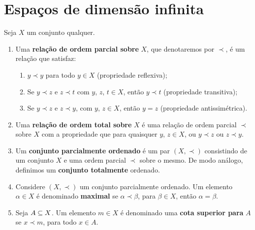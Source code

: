 \section{Espa\c{c}os de dimens\~ao infinita} %
\label{sec:espacos_de_dimensao_infinita}
\begin{definicao}
	Seja $X$ um conjunto qualquer.
	\begin{enumerate}[label={\roman*})]
		\item Uma \textbf{rela\c{c}\~ao de ordem parcial sobre} $X$, que denotaremos por $\prec$, \'e um rela\c{c}\~ao que satisfaz:
		\begin{enumerate}[label={\alph*})]
			\item $y\prec y$ para todo $y \in X$ (propriedade reflexiva);
			\item Se $y\prec z$ e $z\prec t$ com $y$, $z$, $t \in X$, ent\~ao $y\prec t$ (propriedade transitiva);
			\item Se $y\prec z$ e $z\prec y$, com $y$, $z \in X$, ent\~ao $y = z$ (propriedade antissim\'etrica).
		\end{enumerate}
		\item Uma \textbf{rela\c{c}\~ao de ordem total sobre} $X$ \'e uma rela\c{c}\~ao de ordem parcial $\prec$ sobre $X$ com  a propriedade que para quaisquer $y$, $z \in X$, ou $y\prec z$ ou $z\prec y$.
		\item Um \textbf{conjunto parcialmente ordenado} \'e um par $(X, \prec)$ consistindo de um conjunto $X$ e uma ordem parcial $\prec$ sobre o mesmo. De modo an\'alogo, definimos um \textbf{conjunto totalmente} ordenado.
		\item Considere $(X, \prec)$ um conjunto parcialmente ordenado. Um elemento $\alpha \in X$ \'e denominado \textbf{maximal} se $\alpha \prec \beta$, para $\beta \in X$, ent\~ao $\alpha = \beta$.
		\item Seja $A \subseteq X$. Um elemento $m \in X$ \'e denominado uma \textbf{cota superior para} $A$ se $x \prec m$, para todo $x \in A$.
	\end{enumerate}
\end{definicao}

